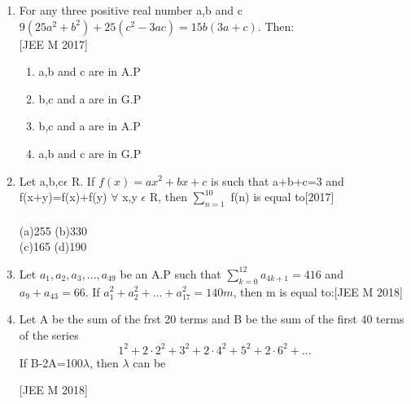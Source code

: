 \documentclass[journal,12pt,twocolumn]{IEEEtran}
\theoremstyle{remark}
\begin{document}
\begin{enumerate}
 \item{For any three positive real number a,b and c $9(25a^2+b^2)+ 25(c^2-3ac) = 15b(3a+c)$. Then:\\ \hfill{[JEE M 2017]}\begin{multicols}{2}
	 \begin{enumerate}\itemsep.5em
  \item{a,b and c are in A.P}
  \item{b,c and a are in G.P}
  \columnbreak
  \item{b,c and a are in A.P}
  \item{a,b and c are in G.P}
  \end{enumerate}
  \end{multicols}}
  \item{Let a,b,c$\epsilon$ R. If $f(x)=ax^2+bx+c$ is such that a+b+c=3 and f(x+y)=f(x)+f(y) $\forall$ x,y $\epsilon$ R, then $\sum _{n=1}^{10}$  f(n)  is  equal  to\hfill{[2017]}\\\\(a)255 \hspace{2cm}(b)330\\(c)165 \hspace{2cm}(d)190} 
  \item{Let $a_{1},a_{2},a_{3},...,a_{49}$ be an A.P such that $\sum_{k=0}^{12} a_{4k+1}=416$ and $a_{9}+a_{43}=66$. If $a_{1}^2+ a_{2}^{2}+...+a_{17}^{2}=140m$, then m is equal to:\hfill{[JEE M 2018]}\begin{enumerate}
  \end{enumerate}}
  \item{Let A be the sum of the frst 20 terms and B be the sum of the first 40 terms of the series \[1^{2} +2\cdot2^{2}+3^{2}+2\cdot4^{2}+5^{2}+2\cdot6^{2}+...\] If B-2A=100$\lambda$, then $\lambda$ can be\hfill{[JEE M 2018]\begin{enumerate}
  \end{enumerate}}
}
\end{enumerate}
\end{document}
